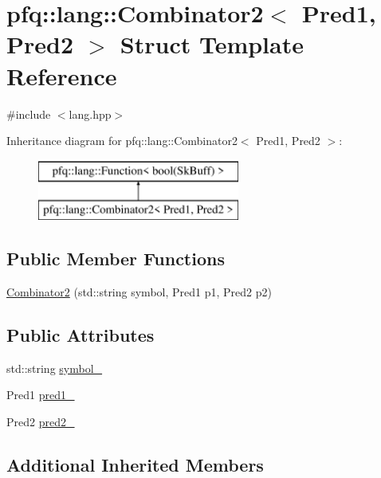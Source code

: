 \hypertarget{structpfq_1_1lang_1_1Combinator2}{\section{pfq\+:\+:lang\+:\+:Combinator2$<$ Pred1, Pred2 $>$ Struct Template Reference}
\label{structpfq_1_1lang_1_1Combinator2}
}


{\ttfamily \#include $<$lang.\+hpp$>$}

Inheritance diagram for pfq\+:\+:lang\+:\+:Combinator2$<$ Pred1, Pred2 $>$\+:\begin{figure}[H]
\begin{center}
\leavevmode
\includegraphics[height=2.000000cm]{structpfq_1_1lang_1_1Combinator2}
\end{center}
\end{figure}
\subsection*{Public Member Functions}
\begin{DoxyCompactItemize}
\item 
\hyperlink{structpfq_1_1lang_1_1Combinator2_a2f0a878cee02ccbabe3fd51b1e746cce}{Combinator2} (std\+::string symbol, Pred1 p1, Pred2 p2)
\end{DoxyCompactItemize}
\subsection*{Public Attributes}
\begin{DoxyCompactItemize}
\item 
std\+::string \hyperlink{structpfq_1_1lang_1_1Combinator2_ab0b5061995f01bcc5826bb62d5fa0b99}{symbol\+\_\+}
\item 
Pred1 \hyperlink{structpfq_1_1lang_1_1Combinator2_ac7a495da4c57d15afb914409014545cd}{pred1\+\_\+}
\item 
Pred2 \hyperlink{structpfq_1_1lang_1_1Combinator2_a464bfd07f446f9f580d7088c75c2dbe2}{pred2\+\_\+}
\end{DoxyCompactItemize}
\subsection*{Additional Inherited Members}


